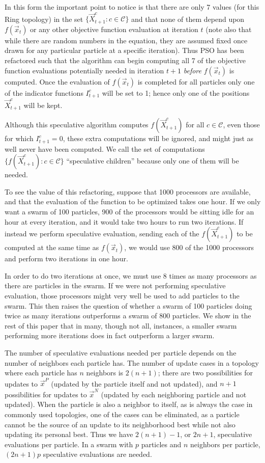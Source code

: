 \documentclass[journal,letterpaper]{IEEEtran}
\providecommand{\pers}{\ensuremath{P}}
\providecommand{\neigh}{\ensuremath{N}}
\providecommand{\ppos}{\ensuremath{\Vec{x}}}
\providecommand{\nbest}{\ensuremath{\Vec{x}^\neigh}}
\providecommand{\pbest}{\ensuremath{\Vec{x}^\pers}}
\providecommand{\ofunc}{\ensuremath{f}}
\providecommand{\indic}{\ensuremath{I}}
\providecommand{\specpos}{\ensuremath{\vec{X}}}
\providecommand{\caseset}{\ensuremath{\mathcal{C}}}
\providecommand{\casegen}{\ensuremath{c}}
\begin{document}
In this form the important point to notice is that there are only 7 values (for
this Ring topology) in the set $\{\specpos_{t+1}^{\casegen}: \casegen \in
\caseset\}$ and that none of them depend upon $f(\ppos_t)$ or any other
objective function evaluation at iteration $t$ (note also that while there are
random numbers in the equation, they are assumed fixed once drawn for any
particular particle at a specific iteration).  Thus PSO has been refactored
such that the algorithm can begin computing all 7 of the objective function
evaluations potentially needed in iteration $t+1$ \emph{before} $f(\ppos_t)$ is
computed.  Once the evaluation of $f(\ppos_{t})$ is completed for all particles
only one of the indicator functions $\indic_{t+1}^{\casegen}$ will be set to 1;
hence only one of the positions $\specpos_{t+1}^\casegen$ will be kept.

Although this speculative algorithm computes
$\ofunc(\specpos_{t+1}^{\casegen})$ for all $\casegen \in \caseset$, even those
for which $\indic_{t+1}^{\casegen} = 0$, these extra computations will be
ignored, and might just as well never have been computed.  We call the set of
computations $\{\ofunc(\specpos_{t+1}^{c}) : \casegen \in \caseset\}$
``speculative children'' because only one of them will be needed.

To see the value of this refactoring, suppose that 1000 processors are
available, and that the evaluation of the function to be optimized takes one
hour.  If we only want a swarm of 100 particles, 900 of the processors would be
sitting idle for an hour at every iteration, and it would take two hours to run
two iterations.  If instead we perform speculative evaluation, sending each of
the $\ofunc(\specpos_{t+1}^{c})$ to be computed at the same time as
$\ofunc(\ppos_{t})$, we would use 800 of the 1000 processors and perform two
iterations in one hour.

In order to do two iterations at once, we must use 8 times as many processors
as there are particles in the swarm.  If we were not performing speculative
evaluation, those processors might very well be used to add particles to the
swarm.  This then raises the question of whether a swarm of 100 particles doing
twice as many iterations outperforms a swarm of 800 particles.  We show in the
rest of this paper that in many, though not all, instances, a smaller swarm
performing more iterations does in fact outperform a larger swarm.

The number of speculative evaluations needed per particle depends on the number
of neighbors each particle has.  The number of update cases in a topology where
each particle has $n$ neighbors is $2(n+1)$; there are two possibilities for
updates to $\pbest$ (updated by the particle itself and not updated), and $n+1$
possibilities for updates to $\nbest$ (updated by each neighboring particle and
not updated).  When the particle is also a neighbor to itself, as is always the
case in commonly used topologies, one of the cases can be eliminated, as a
particle cannot be the source of an update to its neighborhood best while not
also updating its personal best.  Thus we have $2(n+1)-1$, or $2n+1$,
speculative evaluations per particle.  In a swarm with $p$ particles and $n$
neighbors per particle, $(2n+1)p$ speculative evaluations are needed.
\end{document}

